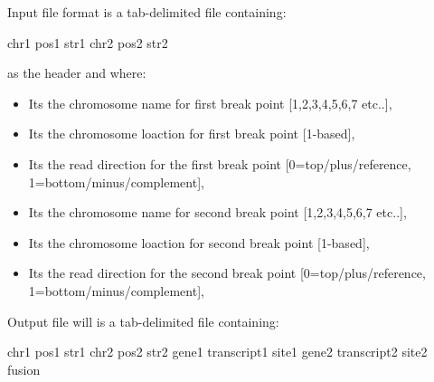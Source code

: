 \documentclass[letterpaper,10pt,english]{sphinxmanual}
\begin{document}
Input file format is a tab-delimited file containing:

chr1  pos1  str1  chr2  pos2  str2

as the header and where:
\begin{itemize}
\item {} 
 Its the chromosome name for first break point {[}1,2,3,4,5,6,7 etc..{]},

\item {} 
 Its the chromosome loaction for first break point {[}1-based{]},

\item {} 
 Its the read direction for the first break point {[}0=top/plus/reference, 1=bottom/minus/complement{]},

\item {} 
 Its the chromosome name for second break point {[}1,2,3,4,5,6,7 etc..{]},

\item {} 
 Its the chromosome loaction for second break point {[}1-based{]},

\item {} 
 Its the read direction for the second break point {[}0=top/plus/reference, 1=bottom/minus/complement{]},

\end{itemize}

Output file will is a tab-delimited file containing:

chr1  pos1  str1  chr2  pos2  str2  gene1 transcript1 site1 gene2 transcript2 site2 fusion
\end{document}
